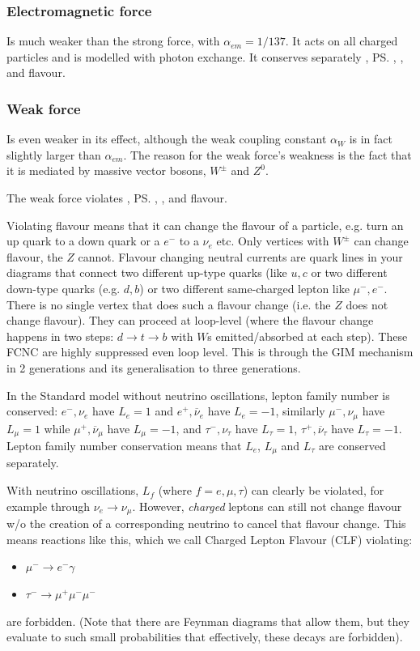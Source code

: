 \subsubsection{Electromagnetic force}
Is much weaker than the strong force, with $\alpha_{em} = 1/137$. It acts on all charged particles and is modelled with photon exchange. It conserves separately \cs, \ps, \cp, and flavour.

\subsubsection{Weak force}
Is even weaker in its effect, although the weak coupling constant $\alpha_W$ is in fact slightly larger than $\alpha_{em}$. The reason for the weak force's weakness is the fact that it is mediated by massive vector bosons, $W^{\pm}$ and $Z^0$.

The weak force violates \cs, \ps, \cp, and flavour.

Violating flavour means that it can change the flavour of a particle, e.g. turn an up quark to a down quark or a $e^-$ to a $\nu_{e}$ etc.
Only vertices with $W^{\pm}$ can change flavour, the $Z$ cannot. Flavour changing neutral currents are quark lines in your diagrams that connect two different up-type quarks (like $u, c$ or two different down-type quarks (e.g. $d, b$) or two different same-charged lepton like $\mu^-, e^-$. There is no single vertex that does such a flavour change (i.e. the $Z$ does not change flavour). They can proceed at loop-level (where the flavour change happens in two steps: $d \to t \to b$ with $W$s emitted/absorbed at each step). These FCNC are highly suppressed even loop level. This is through the GIM mechanism in 2 generations and its generalisation to three generations.

In the Standard model without neutrino oscillations, lepton family number is conserved: $e^-, \nu_e$ have $L_e=1$ and $e^+, \overline{\nu}_e$ have $L_e = -1$, similarly $\mu^-, \nu_{\mu}$ have $L_{\mu}=1$ while $\mu^+, \overline{\nu}_{\mu}$ have $L_{\mu} = -1$, and $\tau^-, \nu_{\tau}$ have $L_{\tau}=1$, $\tau^+, \overline{\nu}_{\tau}$ have $L_{\tau} = -1$. Lepton family number conservation means that $L_e$, $L_{\mu}$ and $L_{\tau}$ are conserved separately. 

With neutrino oscillations, $L_f$ (where $f=e, \mu, \tau$) can clearly be violated, for example through $\nu_e \to \nu_{\mu}$. However, \emph{charged} leptons can still not change flavour w/o the creation of a corresponding neutrino to cancel that flavour change. This means reactions like this, which we call Charged Lepton Flavour (CLF) violating:
\begin{itemize}
\item $\mu^- \to e^- \gamma$
\item $\tau^- \to \mu^+ \mu^- \mu^-$
\end{itemize}
are forbidden. (Note that there are Feynman diagrams that allow them, but they evaluate to such small probabilities that effectively, these decays are forbidden).

